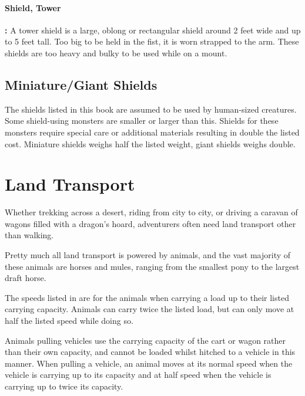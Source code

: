 \begin{multicols*}{2}
\paragraph{Shield, Tower}\textbf{:} A tower shield is a large, oblong or rectangular shield around 2 feet wide and up to 5 feet tall. Too big to be held in the fist, it is worn strapped to the arm. These shields are too heavy and bulky to be used while on a mount.

\subsection{Miniature/Giant Shields}
The shields listed in this book are assumed to be used by human-sized creatures. Some shield-using monsters are smaller or larger than this. Shields for these monsters require special care or additional materials resulting in double the listed cost. Miniature shields weighs half the listed weight, giant shields weighs double.

\section{Land Transport}
Whether trekking across a desert, riding from city to city, or driving a caravan of wagons filled with a dragon’s hoard, adventurers often need land transport other than walking.

Pretty much all land transport is powered by animals, and the vast majority of these animals are horses and mules, ranging from the smallest pony to the largest draft horse.

The speeds listed in  are for the animals when carrying a load up to their listed carrying capacity. Animals can carry twice the listed load, but can only move at half the listed speed while doing so.

Animals pulling vehicles use the carrying capacity of the cart or wagon rather than their own capacity, and cannot be loaded whilst hitched to a vehicle in this manner. When pulling a vehicle, an animal moves at its normal speed when the vehicle is carrying up to its capacity and at half speed when the vehicle is carrying up to twice its capacity.


\end{multicols*}
